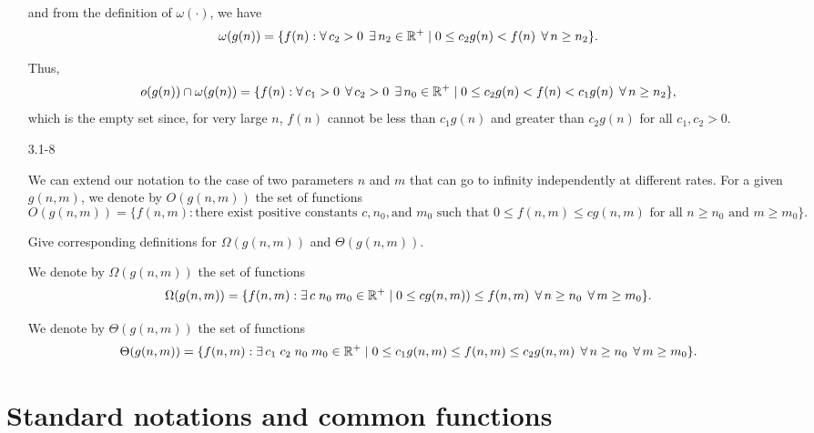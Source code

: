 \begin{enumerate}
\begin{framed}
and from the definition of $\omega(\cdot)$, we have
\[
\omega(g(n)) = \{ f(n) : \operatorname{\forall} c_2 > 0\;\operatorname{\exists} n_2\in\mathbb{R}^+ \mid
                  0 \le c_2g(n) < f(n)\;\operatorname{\forall} n \ge n_2 \}.
\]

Thus,
\[
o(g(n)) \cap \omega(g(n)) =
\{ f(n) : \operatorname{\forall} c_1 > 0\;\operatorname{\forall} c_2>0\;\operatorname{\exists} n_0\in\mathbb{R}^+\mid
   0 \le c_2g(n) < f(n) < c_1g(n)\;\operatorname{\forall} n \ge n_2 \},
\]
which is the empty set since, for very large $n$, $f(n)$ cannot be less than
$c_1 g(n)$ and greater than $c_2 g(n)$ for all $c_1, c_2 > 0$.

\end{framed}

\item[3.1{-}8]{We can extend our notation to the case of two parameters $n$ and
$m$ that can go to infinity independently at different rates. For a given
$g(n, m)$, we denote by $O(g(n, m))$ the set of functions
\[
O(g(n, m)) = \{{f(n, m) : \text{there exist positive constants } c, n_0,
\text{and\ } m_0 \text{\ such that\ } 0 \le f(n, m) \le c g(n, m)
\text{\ for all\ } n \ge n_0 \text{\ and\ } m \ge m_0}\}.
\]

Give corresponding definitions for $\Omega(g(n, m))$ and $\Theta(g(n, m))$.
}

\begin{framed}
We denote by $\Omega(g(n, m))$ the set of functions
\[
\Omega(g(n, m)) = \{f(n, m) : \operatorname{\exists} c\;n_0\;m_0 \in \mathbb{R}^+ \mid
                    0 \le cg(n, m)) \le f(n, m)\;
                    \operatorname{\forall} n \ge n_0\;\operatorname{\forall} m \ge m_0\}.
\]

We denote by $\Theta(g(n, m))$ the set of functions
\[
\Theta(g(n, m)) = \{f(n, m) : \operatorname{\exists} c_1\;c_2\;n_0\;m_0\in\mathbb{R}^+\mid
                    0 \le c_1g(n, m) \le f(n, m) \le c_2g(n, m)\;
                    \operatorname{\forall} n \ge n_0\;\operatorname{\forall} m \ge m_0\}.
\]
\end{framed}

\end{enumerate}

\newpage

\section{Standard notations and common functions}

